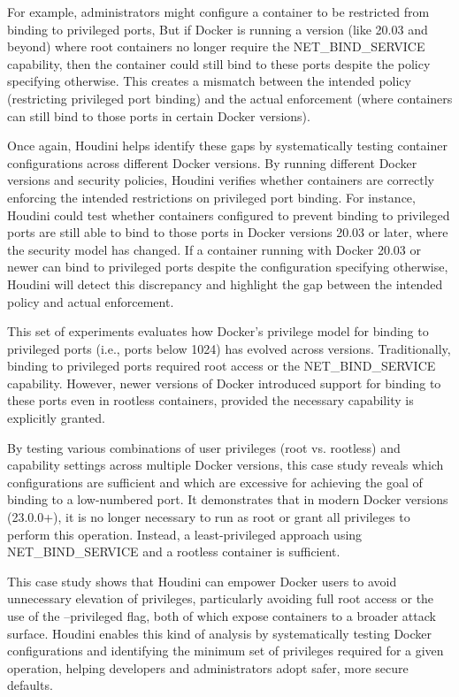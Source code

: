 \documentclass[12pt]{report}
\begin{document}
\begin{doublespace}
For example, administrators might configure a container to be restricted from binding to privileged ports, But if Docker is running a version (like 20.03 and beyond) where root containers no longer require the NET\_BIND\_SERVICE capability, then the container could still bind to these ports despite the policy specifying otherwise. This creates a mismatch between the intended policy (restricting privileged port binding) and the actual enforcement (where containers can still bind to those ports in certain Docker versions).

Once again, Houdini helps identify these gaps by systematically testing container configurations across different Docker versions. By running different Docker versions and security policies, Houdini verifies whether containers are correctly enforcing the intended restrictions on privileged port binding. For instance, Houdini could test whether containers configured to prevent binding to privileged ports are still able to bind to those ports in Docker versions 20.03 or later, where the security model has changed. If a container running with Docker 20.03 or newer can bind to privileged ports despite the configuration specifying otherwise, Houdini will detect this discrepancy and highlight the gap between the intended policy and actual enforcement.

This set of experiments evaluates how Docker's privilege model for binding to privileged ports (i.e., ports below 1024) has evolved across versions. Traditionally, binding to privileged ports required root access or the NET\_BIND\_SERVICE capability. However, newer versions of Docker introduced support for binding to these ports even in rootless containers, provided the necessary capability is explicitly granted.

By testing various combinations of user privileges (root vs. rootless) and capability settings across multiple Docker versions, this case study reveals which configurations are sufficient and which are excessive for achieving the goal of binding to a low-numbered port. It demonstrates that in modern Docker versions (23.0.0+), it is no longer necessary to run as root or grant all privileges to perform this operation. Instead, a least-privileged approach using NET\_BIND\_SERVICE and a rootless container is sufficient.

This case study shows that Houdini can empower Docker users to avoid unnecessary elevation of privileges, particularly avoiding full root access or the use of the --privileged flag, both of which expose containers to a broader attack surface. Houdini enables this kind of analysis by systematically testing Docker configurations and identifying the minimum set of privileges required for a given operation, helping developers and administrators adopt safer, more secure defaults.


\end{doublespace}
\end{document}
